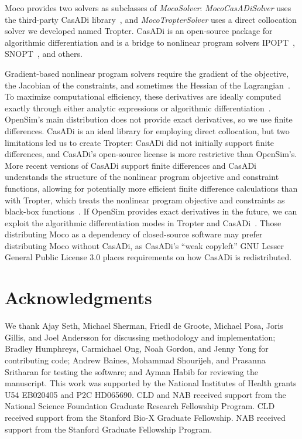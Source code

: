 \documentclass[10pt,letterpaper]{article}
\begin{document}
Moco provides two solvers as subclasses of \textit{MocoSolver}: \textit{MocoCasADiSolver} uses the third-party CasADi library~\cite{Andersson:2019}, and \textit{MocoTropterSolver} uses a direct collocation solver we developed named Tropter. CasADi is an open-source package for algorithmic differentiation and is a bridge to nonlinear program solvers IPOPT~\cite{Wachter:2006}, SNOPT~\cite{Gill:2005}, and others.

Gradient-based nonlinear program solvers require the gradient of the objective, the Jacobian of the constraints, and sometimes the Hessian of the Lagrangian~\cite{Betts:2010}. To maximize computational efficiency, these derivatives are ideally computed exactly through either analytic expressions or algorithmic differentiation~\cite{Andersson:2019,Walther:2003}. OpenSim's main distribution does not provide exact derivatives, so we use finite differences. CasADi is an ideal library for employing direct collocation, but two limitations led us to create Tropter: CasADi did not initially support finite differences, and CasADi's open-source license is more restrictive than OpenSim's. More recent versions of CasADi support finite differences and CasADi understands the structure of the nonlinear program objective and constraint functions, allowing for potentially more efficient finite difference calculations than with Tropter, which treats the nonlinear program objective and constraints as black-box functions~\cite{Patterson:2012}. If OpenSim provides exact derivatives in the future, we can exploit the algorithmic differentiation modes in Tropter and CasADi~\cite{Falisse:2019a}. Those distributing Moco as a dependency of closed-source software may prefer distributing Moco without CasADi, as CasADi's ``weak copyleft'' GNU Lesser General Public License 3.0 places requirements on how CasADi is redistributed.


\section*{Acknowledgments}

We thank Ajay Seth, Michael Sherman, Friedl de Groote, Michael Posa, Joris Gillis, and Joel Andersson for discussing methodology and implementation; Bradley Humphreys, Carmichael Ong, Noah Gordon, and Jenny Yong for contributing code; Andrew Baines, Mohammad Shourijeh, and Prasanna Sritharan for testing the software; and Ayman Habib for reviewing the manuscript.
This work was supported by the National Institutes of Health grants U54 EB020405 and P2C HD065690. CLD and NAB received support from the National Science Foundation Graduate Research Fellowship Program. CLD received support from the Stanford Bio-X Graduate Fellowship. NAB received support from the Stanford Graduate Fellowship Program.
\end{document}
